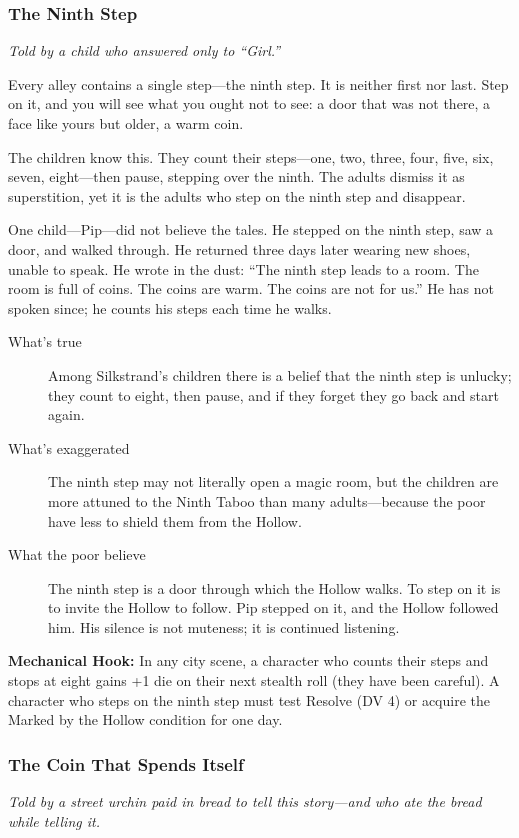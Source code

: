 \documentclass[11pt]{article}
\begin{document}
\subsubsection{The Ninth Step}
\textit{Told by a child who answered only to “Girl.”}

Every alley contains a single step—the ninth step. It is neither first nor last. Step on it, and you will see what you ought not to see: a door that was not there, a face like yours but older, a warm coin.

The children know this. They count their steps—one, two, three, four, five, six, seven, eight—then pause, stepping over the ninth. The adults dismiss it as superstition, yet it is the adults who step on the ninth step and disappear.

One child—Pip—did not believe the tales. He stepped on the ninth step, saw a door, and walked through. He returned three days later wearing new shoes, unable to speak. He wrote in the dust: “The ninth step leads to a room. The room is full of coins. The coins are warm. The coins are not for us.” He has not spoken since; he counts his steps each time he walks.

\begin{description}
\item[What's true] Among Silkstrand’s children there is a belief that the ninth step is unlucky; they count to eight, then pause, and if they forget they go back and start again.
\item[What's exaggerated] The ninth step may not literally open a magic room, but the children are more attuned to the Ninth Taboo than many adults—because the poor have less to shield them from the Hollow.
\item[What the poor believe] The ninth step is a door through which the Hollow walks. To step on it is to invite the Hollow to follow. Pip stepped on it, and the Hollow followed him. His silence is not muteness; it is continued listening.
\end{description}

\textbf{Mechanical Hook:} In any city scene, a character who counts their steps and stops at eight gains +1 die on their next stealth roll (they have been careful). A character who steps on the ninth step must test Resolve (DV 4) or acquire the Marked by the Hollow condition for one day.

\subsubsection{The Coin That Spends Itself}
\textit{Told by a street urchin paid in bread to tell this story—and who ate the bread while telling it.}
\end{document}
